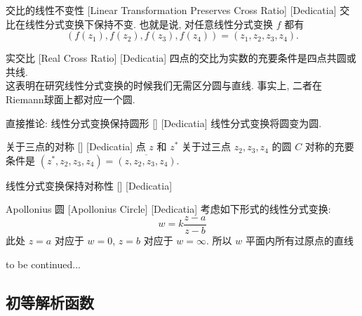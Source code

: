 \documentclass[UTF8]{ctexart}
\newcommand{\continued}{{\Large to be continued...}}
\begin{document}
        \begin{ppt}
            [UUID]
            {交比的线性不变性}
            [Linear Transformation Preserves Cross Ratio]
            [Dedicatia]
            交比在线性分式变换下保持不变. 也就是说, 对任意线性分式变换 \(f\) 都有
            \[(f(z_1),f(z_2),f(z_3),f(z_4))=(z_1,z_2,z_3,z_4).\]
        \end{ppt}

        \begin{ppt}
            [UUID]
            {实交比}
            [Real Cross Ratio]
            [Dedicatia]
            四点的交比为实数的充要条件是四点共圆或共线. \\
            这表明在研究线性分式变换的时候我们无需区分圆与直线. 事实上, 二者在Riemann球面上都对应一个圆. 
        \end{ppt}

        \begin{ppt}
            [UUID]
            {直接推论: 线性分式变换保持圆形}
            []
            [Dedicatia]
            线性分式变换将圆变为圆. 
        \end{ppt}
        
        \begin{ppt}
            [UUID]
            {关于三点的对称}
            []
            [Dedicatia]
            点 \(z\) 和 \(z^*\) 关于过三点 \(z_2,z_3,z_4\) 的圆 \(C\) 对称的充要条件是 \((z^*,z_2,z_3,z_4)=\overline{(z,z_2,z_3,z_4)}\).
        \end{ppt}

        \begin{ppt}
            [UUID]
            {线性分式变换保持对称性}
            []
            [Dedicatia]
        \end{ppt}

        \begin{dfn}
            [UUID]
            {Apollonius 圆}
            [Apollonius Circle]
            [Dedicatia]
            考虑如下形式的线性分式变换: 
            \[w=k\frac{z-a}{z-b}\]
            此处 \(z=a\) 对应于 \(w=0\),  \(z=b\) 对应于 \(w=\infty\). 所以 \(w\) 平面内所有过原点的直线
        \end{dfn}

        \continued
    
    \subsection{初等解析函数}
\end{document}
